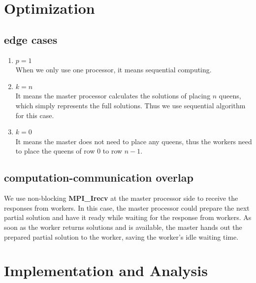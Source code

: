 \documentclass[twoside,12pt]{article}
\begin{document}
\section{Optimization}
\subsection{edge cases}
\begin{enumerate}
	\item $ p = 1 $ \\
	When we only use one processor, it means sequential computing. 
	\item $ k = n $ \\
	It means the master processor calculates the solutions of placing $ n $ queens, which simply represents the full solutions. Thus we use sequential algorithm for this case.	
	\item $ k = 0 $ \\
	It means the master does not need to place any queens, thus the workers need to place the queens of row $ 0 $ to row $ n-1 $.
		
\end{enumerate}

\subsection{computation-communication overlap}
We use non-blocking \textbf{MPI\_Irecv} at the master processor side to receive the responses from workers. In this case, the master processor could prepare the next partial solution and have it ready while waiting for the response from workers. As soon as the worker returns solutions and is available, the master hands out the prepared partial solution to the worker, saving the worker's idle waiting time. 


\section{Implementation and Analysis}
\end{document}
